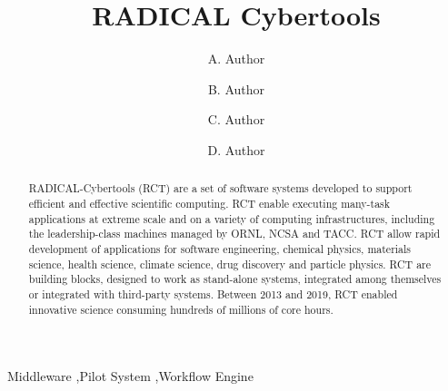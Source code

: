 \documentclass[preprint,12pt, a4paper]{elsarticle}
\begin{document}
\begin{frontmatter}

\title{RADICAL Cybertools}

\author{A. Author}
\address{Your institute, some address}

\author{B. Author}
\address{Your institute, some address}

\author{C. Author}
\address{Your institute, some address}

\author{D. Author}
\address{Your institute, some address}

\begin{abstract}
RADICAL-Cybertools (RCT) are a set of software systems developed to support
efficient and effective scientific computing. RCT enable executing many-task
applications at extreme scale and on a variety of computing infrastructures,
including the leadership-class machines managed by ORNL, NCSA and TACC. RCT
allow rapid development of applications for software engineering, chemical
physics, materials science, health science, climate science, drug discovery
and particle physics. RCT are building blocks, designed to work as
stand-alone systems, integrated among themselves or integrated with
third-party systems. Between 2013 and 2019, RCT enabled innovative science
consuming hundreds of millions of core hours.
\end{abstract}

\begin{keyword}
Middleware \sep Pilot System \sep Workflow Engine



\end{keyword}

\end{frontmatter}

\linenumbers{}

\end{document}

